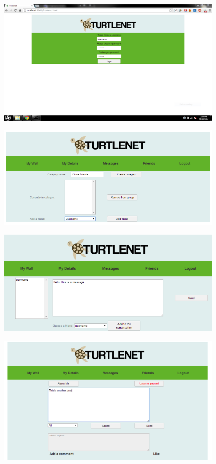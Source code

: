 \begin{centering}
\begin{figure}[p] \includegraphics[scale=0.5]{images/screenshots/5loginagain.png} \end{figure}
\begin{figure}[p] \includegraphics[scale=0.5]{images/screenshots/crop1.png} \end{figure}
\begin{figure}[p] \includegraphics[scale=0.5]{images/screenshots/crop2.png} \end{figure}
\begin{figure}[p] \includegraphics[scale=0.5]{images/screenshots/crop3.png} \end{figure}

\end{centering}

